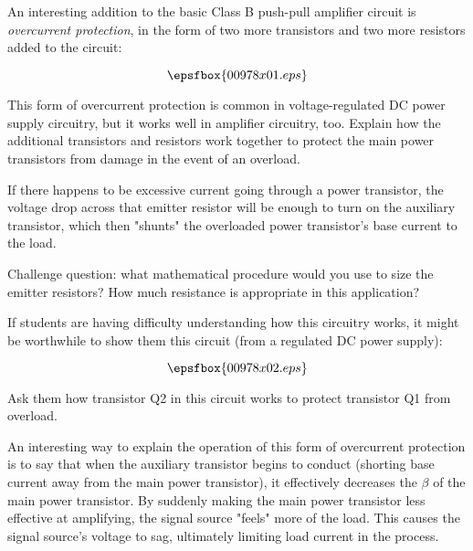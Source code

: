 

An interesting addition to the basic Class B push-pull amplifier circuit is {\it overcurrent protection}, in the form of two more transistors and two more resistors added to the circuit:

$$\epsfbox{00978x01.eps}$$

This form of overcurrent protection is common in voltage-regulated DC power supply circuitry, but it works well in amplifier circuitry, too.  Explain how the additional transistors and resistors work together to protect the main power transistors from damage in the event of an overload.







If there happens to be excessive current going through a power transistor, the voltage drop across that emitter resistor will be enough to turn on the auxiliary transistor, which then "shunts" the overloaded power transistor's base current to the load.

\vskip 10pt

Challenge question: what mathematical procedure would you use to size the emitter resistors?  How much resistance is appropriate in this application?







If students are having difficulty understanding how this circuitry works, it might be worthwhile to show them this circuit (from a regulated DC power supply):

$$\epsfbox{00978x02.eps}$$

Ask them how transistor Q2 in this circuit works to protect transistor Q1 from overload.

\vskip 10pt

An interesting way to explain the operation of this form of overcurrent protection is to say that when the auxiliary transistor begins to conduct (shorting base current away from the main power transistor), it effectively decreases the $\beta$ of the main power transistor.  By suddenly making the main power transistor less effective at amplifying, the signal source "feels" more of the load.  This causes the signal source's voltage to sag, ultimately limiting load current in the process.




